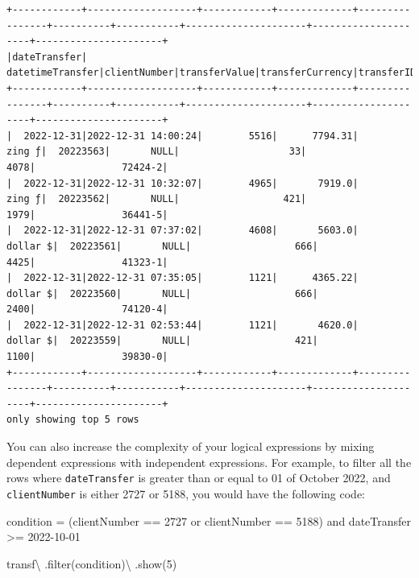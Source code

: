 \documentclass[
  11pt,
  letterpaper,
  DIV=11,
  numbers=noendperiod]{scrreprt}
\newenvironment{Shaded}{\begin{snugshade}}{\end{snugshade}}
\newcommand{\BuiltInTok}[1]{\textcolor[rgb]{0.00,0.23,0.31}{#1}}
\newcommand{\DecValTok}[1]{\textcolor[rgb]{0.68,0.00,0.00}{#1}}
\newcommand{\NormalTok}[1]{\textcolor[rgb]{0.00,0.23,0.31}{#1}}
\newcommand{\OperatorTok}[1]{\textcolor[rgb]{0.37,0.37,0.37}{#1}}
\newcommand{\StringTok}[1]{\textcolor[rgb]{0.13,0.47,0.30}{#1}}
\begin{document}
\begin{verbatim}
+------------+-------------------+------------+-------------+----------------+----------+-----------+---------------------+---------------------+----------------------+
|dateTransfer|   datetimeTransfer|clientNumber|transferValue|transferCurrency|transferID|transferLog|destinationBankNumber|destinationBankBranch|destinationBankAccount|
+------------+-------------------+------------+-------------+----------------+----------+-----------+---------------------+---------------------+----------------------+
|  2022-12-31|2022-12-31 14:00:24|        5516|      7794.31|          zing ƒ|  20223563|       NULL|                   33|                 4078|               72424-2|
|  2022-12-31|2022-12-31 10:32:07|        4965|       7919.0|          zing ƒ|  20223562|       NULL|                  421|                 1979|               36441-5|
|  2022-12-31|2022-12-31 07:37:02|        4608|       5603.0|        dollar $|  20223561|       NULL|                  666|                 4425|               41323-1|
|  2022-12-31|2022-12-31 07:35:05|        1121|      4365.22|        dollar $|  20223560|       NULL|                  666|                 2400|               74120-4|
|  2022-12-31|2022-12-31 02:53:44|        1121|       4620.0|        dollar $|  20223559|       NULL|                  421|                 1100|               39830-0|
+------------+-------------------+------------+-------------+----------------+----------+-----------+---------------------+---------------------+----------------------+
only showing top 5 rows
\end{verbatim}

You can also increase the complexity of your logical expressions by
mixing dependent expressions with independent expressions. For example,
to filter all the rows where \texttt{dateTransfer} is greater than or
equal to 01 of October 2022, and \texttt{clientNumber} is either 2727 or
5188, you would have the following code:

\begin{Shaded}
\begin{Highlighting}[]
\NormalTok{condition }\OperatorTok{=} \StringTok{\textquotesingle{}\textquotesingle{}\textquotesingle{}}
\StringTok{  (clientNumber == 2727 or clientNumber == 5188)}
\StringTok{  and dateTransfer \textgreater{}= \textquotesingle{}2022{-}10{-}01\textquotesingle{}}
\StringTok{\textquotesingle{}\textquotesingle{}\textquotesingle{}}

\NormalTok{transf}\OperatorTok{\textbackslash{}}
\NormalTok{  .}\BuiltInTok{filter}\NormalTok{(condition)}\OperatorTok{\textbackslash{}}
\NormalTok{  .show(}\DecValTok{5}\NormalTok{)}
\end{Highlighting}
\end{Shaded}
\end{document}
